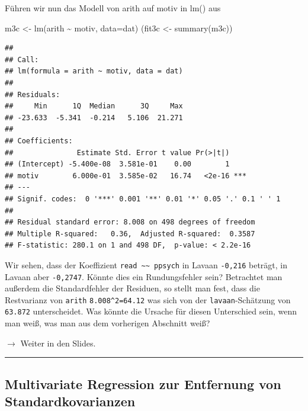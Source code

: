 \documentclass[
]{article}
\newenvironment{Shaded}{\begin{snugshade}}{\end{snugshade}}
\newcommand{\AttributeTok}[1]{\textcolor[rgb]{0.77,0.63,0.00}{#1}}
\newcommand{\FunctionTok}[1]{\textcolor[rgb]{0.00,0.00,0.00}{#1}}
\newcommand{\NormalTok}[1]{#1}
\newcommand{\OtherTok}[1]{\textcolor[rgb]{0.56,0.35,0.01}{#1}}
\newcommand{\SpecialCharTok}[1]{\textcolor[rgb]{0.00,0.00,0.00}{#1}}
\begin{document}
Führen wir nun das Modell von arith auf motiv in lm() aus

\begin{Shaded}
\begin{Highlighting}[]
\NormalTok{m3c }\OtherTok{\textless{}{-}} \FunctionTok{lm}\NormalTok{(arith }\SpecialCharTok{\textasciitilde{}}\NormalTok{ motiv, }\AttributeTok{data=}\NormalTok{dat)}
\NormalTok{(fit3c }\OtherTok{\textless{}{-}} \FunctionTok{summary}\NormalTok{(m3c))}
\end{Highlighting}
\end{Shaded}

\begin{verbatim}
## 
## Call:
## lm(formula = arith ~ motiv, data = dat)
## 
## Residuals:
##     Min      1Q  Median      3Q     Max 
## -23.633  -5.341  -0.214   5.106  21.271 
## 
## Coefficients:
##               Estimate Std. Error t value Pr(>|t|)    
## (Intercept) -5.400e-08  3.581e-01    0.00        1    
## motiv        6.000e-01  3.585e-02   16.74   <2e-16 ***
## ---
## Signif. codes:  0 '***' 0.001 '**' 0.01 '*' 0.05 '.' 0.1 ' ' 1
## 
## Residual standard error: 8.008 on 498 degrees of freedom
## Multiple R-squared:   0.36,  Adjusted R-squared:  0.3587 
## F-statistic: 280.1 on 1 and 498 DF,  p-value: < 2.2e-16
\end{verbatim}

Wir sehen, dass der Koeffizient
\texttt{read\ \textasciitilde{}\textasciitilde{}\ ppsych} in Lavaan
\texttt{-0,216} beträgt, in Lavaan aber \texttt{-0,2747}. Könnte dies
ein Rundungsfehler sein? Betrachtet man außerdem die Standardfehler der
Residuen, so stellt man fest, dass die Restvarianz von \texttt{arith}
\texttt{8.008\^{}2=64.12} was sich von der \texttt{lavaan}-Schätzung von
\texttt{63.872} unterscheidet. Was könnte die Ursache für diesen
Unterschied sein, wenn man weiß, was man aus dem vorherigen Abschnitt
weiß?

\(\rightarrow\) Weiter in den Slides.

\begin{center}\rule{0.5\linewidth}{0.5pt}\end{center}

\hypertarget{multivariate-regression-zur-entfernung-von-standardkovarianzen}{%
\subsection{Multivariate Regression zur Entfernung von
Standardkovarianzen}\label{multivariate-regression-zur-entfernung-von-standardkovarianzen}}
\end{document}
